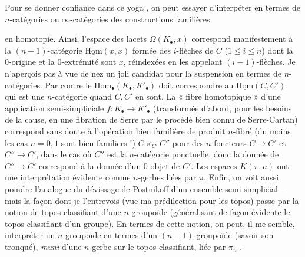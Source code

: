 \documentclass[11pt,a4paper]{article}
\begin{document}
Pour se donner confiance dans ce yoga , on peut essayer d'interpéter en termes de $n$-catégories ou $\infty$-catégories des constructions familières

en homotopie. Ainsi, l'espace des lacets $\Omega(K_\bullet, x)$ correspond manifestement à la $(n-1)$-catégorie $\underline{\mathrm{Hom}}(x, x)$ formée des $i$-flèches de $C$ ($1 \leqslant i \leqslant n$) dont la 0-origine et la 0-extrémité sont $x$, réindexées en les appelant $(i-1)$-flèches. Je n'aperçois pas à vue de nez un joli candidat pour la suspension en termes de $n$-catégories. Par contre le $\mathrm{Hom}_\bullet(K_\bullet, K'_\bullet)$ doit correspondre au $\underline{\mathrm{Hom}}(C, C')$, qui est une $n$-catégorie quand $C, C'$ en sont. La « fibre homotopique » d'une application semi-simpliciale $f\colon K_\bullet \to K'_\bullet$ (transformée d'abord, pour les besoins de la cause, en une fibration de Serre par le procédé bien connu de Serre-Cartan) correspond sans doute à l'opération bien familière de produit $n$-fibré (du moins les cas $n = 0, 1$ sont bien familiers !) $C \times_{C'} C''$ pour des $n$-foncteurs $C \to C'$ et $C'' \to C'$, dans le cas où $C''$ est la $n$-catégorie ponctuelle, donc la donnée de $C'' \to C'$ correspond à la donnée d'un 0-objet de $C'$. Les espaces $K(\pi, n)$ ont une interprétation évidente comme $n$-gerbes liées par $\pi$. Enfin, on voit aussi poindre l'analogue du dévissage de Postnikoff d'un ensemble semi-simplicial -- mais la façon dont je l'entrevois (vue ma prédilection pour les topos) passe par la notion de topos classifiant d'une $n$-groupoïde (généralisant de façon évidente le topos classifiant d'un groupe). En termes de cette notion, on peut, il me semble, interpréter un $n$-groupoïde en termes d'un $(n-1)$-groupoïde (savoir son tronqué), \emph{muni} d'une $n$-gerbe sur le topos classifiant, liée par $\pi_n$ .
\end{document}
